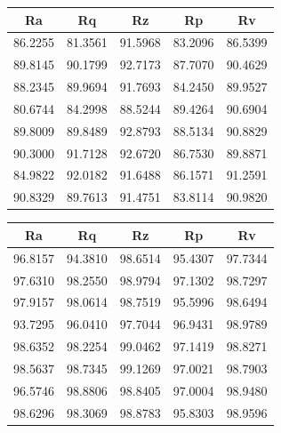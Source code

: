 \documentclass[suppldata]{interact}
\begin{document}
\begin {landscape}
\begin{minipage}{0.35\textwidth}
\begin{tabular}{|c|c|c|c|c|c|}
    \end{tabular}
        \label{tab:gdamsete}
    \end{minipage}
   \hfill 
   \begin{minipage}{0.30\textwidth}
   \small
\centering
    \centering
     \begin{tabular}{|c|c|c|c|c|}
    \hline
         Ra &  Rq &  Rz &  Rp & Rv \\ \hline
        86.2255 & 81.3561 & 91.5968 & 83.2096 & 86.5399 \\ \hline
        89.8145 & 90.1799 & 92.7173 & 87.7070 & 90.4629 \\ \hline
        88.2345 & 89.9694 & 91.7693 & 84.2450 & 89.9527 \\ \hline
        80.6744 & 84.2998 & 88.5244 & 89.4264 & 90.6904 \\ \hline
        89.8009 & 89.8489 & 92.8793 & 88.5134 & 90.8829 \\ \hline
        90.3000 & 91.7128 & 92.6720 & 86.7530 & 89.8871 \\ \hline
        84.9822 & 92.0182 & 91.6488 & 86.1571 & 91.2591 \\ \hline
        90.8329 & 89.7613 & 91.4751 & 83.8114 & 90.9820 \\ \hline
    \end{tabular}
        \label{tab:gdamapete}
    \end{minipage}
    \hfill
  \begin{minipage}{0.40\textwidth}
  \small
    \begin{tabular}{|c|c|c|c|c|}
    \hline
         Ra &  Rq &  Rz &  Rp & Rv \\ \hline
        96.8157 & 94.3810 & 98.6514 & 95.4307 & 97.7344 \\ \hline
        97.6310 & 98.2550 & 98.9794 & 97.1302 & 98.7297 \\ \hline
        97.9157 & 98.0614 & 98.7519 & 95.5996 & 98.6494 \\ \hline
        93.7295 & 96.0410 & 97.7044 & 96.9431 & 98.9789 \\ \hline
        98.6352 & 98.2254 & 99.0462 & 97.1419 & 98.8271 \\ \hline
        98.5637 & 98.7345 & 99.1269 & 97.0021 & 98.7903 \\ \hline
        96.5746 & 98.8806 & 98.8405 & 97.0004 & 98.9480 \\ \hline
        98.6296 & 98.3069 & 98.8783 & 95.8303 & 98.9596 \\ \hline
     \end{tabular}
     \label{tab:gdar2te}
     \end{minipage}
 \end{landscape}
\end{document}
